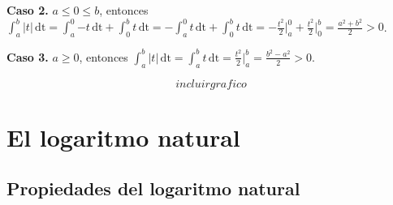 \documentclass[pts12]{article}
\numberwithin{equation}{section}
\newcommand{\Col}{\color{ProcessBlue}}
\begin{document}
\begin{itemize}
\textbf{Caso 2.} $a\leq 0\leq b$, entonces $\int_{a}^{b} \! {|t|} \, \mathrm{dt}=\int_{a}^{0} \! {-t} \, \mathrm{dt}+\int_{0}^{b} \! {t} \, \mathrm{dt}=-\int_{a}^{0} \! {t} \, \mathrm{dt}+\int_{0}^{b} \! {t} \, \mathrm{dt}=-\frac{t^2}{2}\Big|_a^0+\frac{t^2}{2}\Big|_0^b=\frac{a^2+b^2}{2}>0$.

\textbf{Caso 3.} $a\geq 0$, entonces $\int_{a}^{b} \! {|t|} \, \mathrm{dt}=\int_{a}^{b} \! {t} \, \mathrm{dt}=\frac{t^2}{2}\Big|_a^b=\frac{b^2-a^2}{2}>0$.

$$ incluirgrafico $$

\end{itemize}

\newpage

\section{\Col El logaritmo natural}

\subsection{\Col Propiedades del logaritmo natural}
\end{document}
